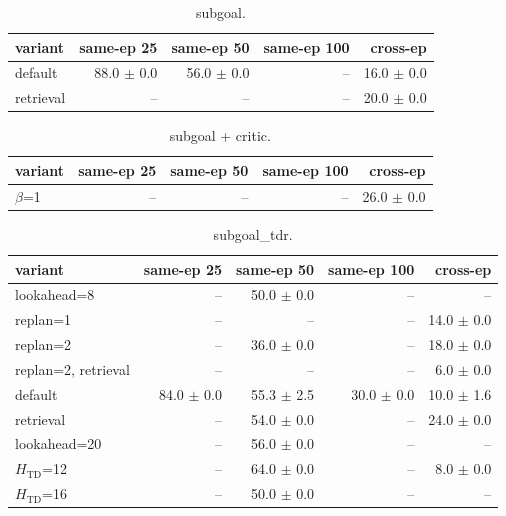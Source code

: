\begin{table}[H]
\centering\small
\caption{subgoal.}
\label{tab:gas-mpc-subgoal-perseed-n50}
\begin{tabular}{lrrrr}
\toprule
variant & same-ep 25 & same-ep 50 & same-ep 100 & cross-ep \\
\midrule
default & 88.0 $\pm$ 0.0 & 56.0 $\pm$ 0.0 & -- & 16.0 $\pm$ 0.0 \\
retrieval & -- & -- & -- & 20.0 $\pm$ 0.0 \\
\bottomrule
\end{tabular}
\end{table}

\begin{table}[H]
\centering\small
\caption{subgoal + critic.}
\label{tab:gas-mpc-subgoal-crit-perseed-n50}
\begin{tabular}{lrrrr}
\toprule
variant & same-ep 25 & same-ep 50 & same-ep 100 & cross-ep \\
\midrule
$\beta$=1 & -- & -- & -- & 26.0 $\pm$ 0.0 \\
\bottomrule
\end{tabular}
\end{table}

\begin{table}[H]
\centering\small
\caption{subgoal\_tdr.}
\label{tab:gas-mpc-subgoal_tdr-perseed-n50}
\begin{tabular}{lrrrr}
\toprule
variant & same-ep 25 & same-ep 50 & same-ep 100 & cross-ep \\
\midrule
lookahead=8 & -- & 50.0 $\pm$ 0.0 & -- & -- \\
replan=1 & -- & -- & -- & 14.0 $\pm$ 0.0 \\
replan=2 & -- & 36.0 $\pm$ 0.0 & -- & 18.0 $\pm$ 0.0 \\
replan=2, retrieval & -- & -- & -- & 6.0 $\pm$ 0.0 \\
default & 84.0 $\pm$ 0.0 & 55.3 $\pm$ 2.5 & 30.0 $\pm$ 0.0 & 10.0 $\pm$ 1.6 \\
retrieval & -- & 54.0 $\pm$ 0.0 & -- & 24.0 $\pm$ 0.0 \\
lookahead=20 & -- & 56.0 $\pm$ 0.0 & -- & -- \\
$H_{\mathrm{TD}}$=12 & -- & 64.0 $\pm$ 0.0 & -- & 8.0 $\pm$ 0.0 \\
$H_{\mathrm{TD}}$=16 & -- & 50.0 $\pm$ 0.0 & -- & -- \\
\bottomrule
\end{tabular}
\end{table}

